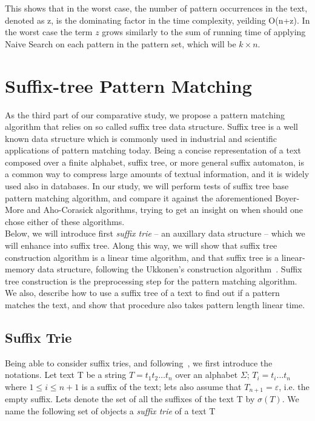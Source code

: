 \documentclass[paper=a4, fontsize=11pt]{scrartcl} %
\numberwithin{equation}{section} %
\numberwithin{figure}{section} %
\numberwithin{table}{section} %
\begin{document}
This shows that in the worst case, the number of pattern occurrences in the text, denoted as z, is the dominating factor in the time complexity, yeilding O(n+z). In the worst case the term $z$ grows similarly to the sum of running time of applying Naive Search on each pattern in the pattern set, which will be $k\times n$.



\newpage

\section{Suffix-tree Pattern Matching}
As the third part of our comparative study, we propose a pattern matching algorithm that relies on so called suffix tree data structure. Suffix tree is a well known data structure which is commonly used in industrial and scientific applications of pattern matching today. Being a concise representation of a text composed over a finite alphabet, suffix tree, or more general suffix automaton, is a common way to compress large amounts of textual information, and it is widely used also in databases. In our study, we will perform tests of suffix tree base pattern matching algorithm, and compare it against the aforementioned Boyer-More and Aho-Corasick algorithms, trying to get an insight on when should one chose either of these algorithms.\\

Below, we will introduce first \textit{suffix trie} -- an auxillary data structure -- which we will enhance into suffix tree. Along this way, we will show that suffix tree construction algorithm is a linear time algorithm, and that suffix tree is a linear-memory data structure, following the Ukkonen's construction algorithm~\cite{ukkonen1995online}. Suffix tree construction is the preprocessing step for the pattern matching algorithm. We also, describe how to use a suffix tree of a text to find out if a pattern matches the text, and show that procedure also takes pattern length linear time.

\subsection{Suffix Trie}
Being able to consider suffix tries, and following~\cite{ukkonen1995online}, we first introduce the notations. Let text T be a string $T = t_1 t_2 \dots t_n$ over an alphabet $\Sigma$; $T_i = t_i \dots t_n$ where $1 \leq i \leq n+1$ is a suffix of the text; lets also assume that $T_{n+1} = \varepsilon$, i.e. the empty suffix. Lets denote the set of all the suffixes of the text T by $\sigma(T)$. We name the following set of objects a \textit{suffix trie} of a text T
\end{document}
